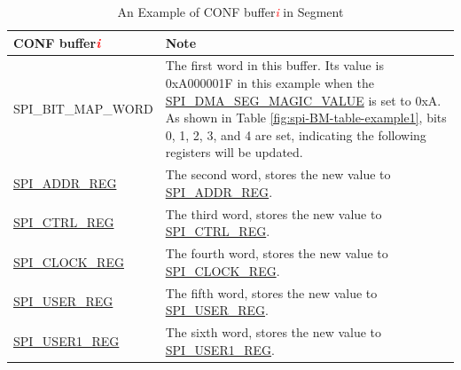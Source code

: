 \documentclass[main\_\_EN.tex]{subfiles}
\begin{document}
\begin{longtable}[c]{|p{3.5cm}|p{10cm}| }
\caption{An Example of CONF buffer\textcolor{red}{\it i} in Segment  }
\label{fig:spi-BM-table-example2}\\\hline
\rowcolor{lightgray}
     \textbf{CONF buffer\textcolor{red}{\it i}} & \textbf{Note} \\\hline
     \centering\vfill SPI\_BIT\_MAP\_WORD\vfill & The first word in this buffer. Its value is 0xA000001F in this example when the \hyperref[fielddesc:SPIDMASEGMAGICVALUE]{SPI\_DMA\_SEG\_MAGIC\_VALUE} is set to 0xA. As shown in Table \ref{fig:spi-BM-table-example1}, bits 0, 1, 2, 3, and 4 are set, indicating the following registers will be updated. \\\hline

    \hyperref[regdesc:SPIADDRREG]{SPI\_ADDR\_REG} & The second word, stores the new value to \hyperref[regdesc:SPIADDRREG]{SPI\_ADDR\_REG}.
     \\\hline
    \hyperref[regdesc:SPICTRLREG]{SPI\_CTRL\_REG} & The third word, stores the new value to \hyperref[regdesc:SPICTRLREG]{SPI\_CTRL\_REG}.
     \\\hline
    \hyperref[regdesc:SPICLOCKREG]{SPI\_CLOCK\_REG} & The fourth word, stores the new value to \hyperref[regdesc:SPICLOCKREG]{SPI\_CLOCK\_REG}.
     \\\hline
    \hyperref[regdesc:SPIUSERREG]{SPI\_USER\_REG} &The fifth word, stores the new value to \hyperref[regdesc:SPIUSERREG]{SPI\_USER\_REG}.
     \\\hline
    \hyperref[regdesc:SPIUSER1REG]{SPI\_USER1\_REG} &The sixth word, stores the new value to \hyperref[regdesc:SPIUSER1REG]{SPI\_USER1\_REG}.
     \\\hline
\end{longtable}
\end{document}
